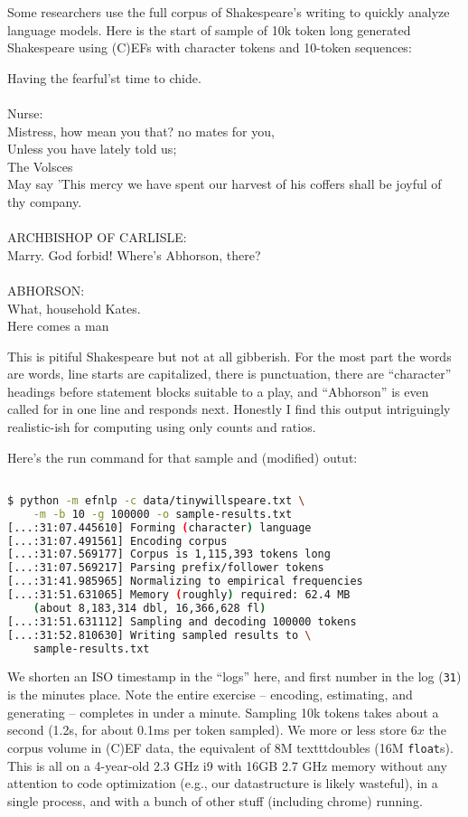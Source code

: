 \documentclass[11pt, oneside]{amsart}   	%
\begin{document}
Some researchers use the full corpus of Shakespeare's writing to quickly analyze language models. Here is the start of sample of 10k token long generated Shakespeare using (C)EFs with character tokens and 10-token sequences: 
\begin{displayquote}
Having the fearful'st time to chide.\\
\\
Nurse:\\
Mistress, how mean you that? no mates for you,\\
Unless you have lately told us;\\
The Volsces\\
May say 'This mercy we have spent our harvest of his coffers shall be joyful of thy company.\\
\\
ARCHBISHOP OF CARLISLE:\\
Marry. God forbid! Where's Abhorson, there?\\
\\
ABHORSON:\\
What, household Kates.\\
Here comes a man\\
\end{displayquote}
This is pitiful Shakespeare but not at all gibberish. For the most part the words are words, line starts are capitalized, there is punctuation, there are ``character'' headings before statement blocks suitable to a play, and ``Abhorson'' is even called for in one line and responds next. Honestly I find this output intriguingly realistic-ish for computing using only counts and ratios. 

Here's the run command for that sample and (modified) outut: 
\begin{lstlisting}[language=bash,caption={Analyzing and generating some Shakespeare with (C)EFs}]

$ python -m efnlp -c data/tinywillspeare.txt \
	-m -b 10 -g 100000 -o sample-results.txt
[...:31:07.445610] Forming (character) language
[...:31:07.491561] Encoding corpus
[...:31:07.569177] Corpus is 1,115,393 tokens long
[...:31:07.569217] Parsing prefix/follower tokens
[...:31:41.985965] Normalizing to empirical frequencies
[...:31:51.631065] Memory (roughly) required: 62.4 MB 
	(about 8,183,314 dbl, 16,366,628 fl)
[...:31:51.631112] Sampling and decoding 100000 tokens
[...:31:52.810630] Writing sampled results to \
	sample-results.txt
\end{lstlisting}
We shorten an ISO timestamp in the ``logs'' here, and first number in the log (\texttt{31}) is the minutes place. Note the entire exercise -- encoding, estimating, and generating -- completes in under a minute. Sampling 10k tokens takes about a second (1.2s, for about 0.1ms per token sampled). We more or less store $6x$ the corpus volume in (C)EF data, the equivalent of 8M texttt{double}s (16M \texttt{float}s). This is all on a 4-year-old 2.3 GHz i9 with 16GB 2.7 GHz memory without any attention to code optimization (e.g., our datastructure is likely wasteful), in a single process, and with a bunch of other stuff (including chrome) running. 
\end{document}
